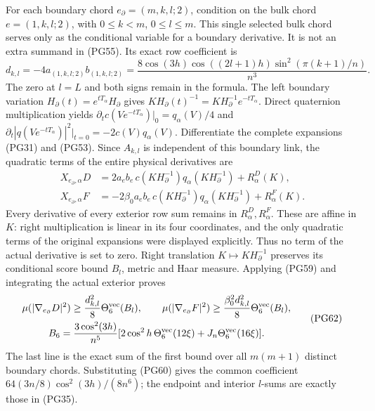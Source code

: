 \documentclass[11pt]{article}
\begin{document}
For each boundary chord \(e_\partial=(m,k,l;2)\), condition on
the bulk chord \(e=(1,k,l;2)\), with \(0\le k<m\), \(0\le l\le m\).
This single selected bulk chord serves only as the conditional
variable for a boundary derivative. It is not an extra summand
in (PG55). Its exact row coefficient is
\[
 d_{k,l}=-4a_{(1,k,l;2)}b_{(1,k,l;2)}
 =\frac{8\cos(3h)\cos((2l+1)h)\sin^2(\pi(k+1)/n)}{n^3}.
 \tag{PG60}
\]
The zero at \(l=L\) and both signs remain in the formula.
The left boundary variation \(H_\partial(t)=e^{tT_\alpha}H_\partial\)
gives \(KH_\partial(t)^{-1}=KH_\partial^{-1}e^{-tT_\alpha}\).
Direct quaternion multiplication yields
\(\partial_t c(Ve^{-tT_\alpha})|_0=q_\alpha(V)/4\) and
\(\partial_t|q(Ve^{-tT_\alpha})|^2|_{t=0}=-2c(V)q_\alpha(V)\).
Differentiate the complete expansions (PG31) and (PG53).
Since \(A_{k,l}\) is independent of this boundary link, the
quadratic terms of the entire physical derivatives are
\[
 \begin{aligned}
 X_{e_\partial,\alpha}D
    &=2a_eb_e\,c(KH_\partial^{-1})
                    q_\alpha(KH_\partial^{-1})+R^D_\alpha(K),\\
 X_{e_\partial,\alpha}F
    &=-2\beta_0a_eb_e\,c(KH_\partial^{-1})
                    q_\alpha(KH_\partial^{-1})+R^F_\alpha(K).
 \end{aligned}\tag{PG61}
\]
Every derivative of every exterior row sum remains in
\(R^D_\alpha,R^F_\alpha\). These are affine in \(K\):
right multiplication is linear in its four coordinates, and the
only quadratic terms of the original expansions were displayed
explicitly. Thus no term of the actual derivative is set to zero.
Right translation \(K\mapsto KH_\partial^{-1}\) preserves its
conditional score bound \(B_l\), metric and Haar measure.
Applying (PG59) and integrating the actual exterior proves
\[
 \begin{gathered}
 \mu(|\nabla_{e_\partial}D|^2)
           \ge\frac{d_{k,l}^2}{8}\Theta_6^{\rm vec}(B_l),\qquad
 \mu(|\nabla_{e_\partial}F|^2)
           \ge\frac{\beta_0^2d_{k,l}^2}{8}
                                      \Theta_6^{\rm vec}(B_l),\\
 B_6=\frac{3\cos^2(3h)}{n^5}
       [2\cos^2h\,\Theta_6^{\rm vec}(12\xi)
                         +J_n\Theta_6^{\rm vec}(16\xi)] .
 \end{gathered}\tag{PG62}
\]
The last line is the exact sum of the first bound over all
\(m(m+1)\) distinct boundary chords. Substituting (PG60) gives
the common coefficient \(64(3n/8)\cos^2(3h)/(8n^6)\);
the endpoint and interior \(l\)-sums are exactly those in (PG35).
\end{document}
